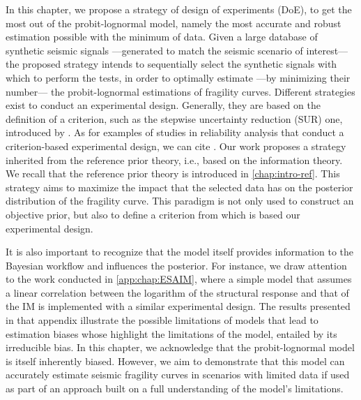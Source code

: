 




In this chapter, we propose a strategy of design of experiments (DoE), to get the most out of the probit-lognormal model, namely the most accurate and robust estimation possible with the minimum of data. Given a large database of synthetic seismic signals ---generated to match the seismic scenario of interest--- the proposed strategy intends to sequentially select the synthetic signals with which to perform 
the tests, in order to optimally estimate ---by minimizing their number--- the probit-lognormal estimations of fragility curves. 
Different strategies exist to conduct an experimental design. Generally, they are based on the definition of a criterion, such as the stepwise uncertainty reduction (SUR) one, introduced by \citet{bect_supermartingale_2019}. 
As for examples of studies in reliability analysis that conduct a criterion-based experimental design, we can cite \cite{azzimonti_adaptive_2021,agrell_sequential_2021,lartaud_sequential_2025}.
Our work proposes a strategy inherited from the reference prior theory, i.e., based on the information theory. We recall that the reference prior theory is introduced in \cref{chap:intro-ref}. This strategy aims to maximize the impact that the selected data has on the posterior distribution of the fragility curve. 
This paradigm is not only used to construct an objective prior, %
but also to define a criterion from which is based our experimental design.





It is also important to recognize that the model itself provides information to the Bayesian workflow and influences the posterior.
For instance, 
we draw attention to the work conducted in \cref{app:chap:ESAIM}, where a simple model that assumes a linear correlation between the logarithm of the structural response and that of the IM is implemented with a similar experimental design. 
The results presented in that appendix illustrate the possible limitations of models that lead to estimation biases whose  highlight the limitations of the model,  entailed by its irreducible bias. %
In this chapter, we acknowledge that the probit-lognormal model %
is itself inherently biased. However, we aim to demonstrate that this model can accurately estimate seismic fragility curves in scenarios with limited data if used as part of an approach built on a full understanding of the model's limitations.
%



